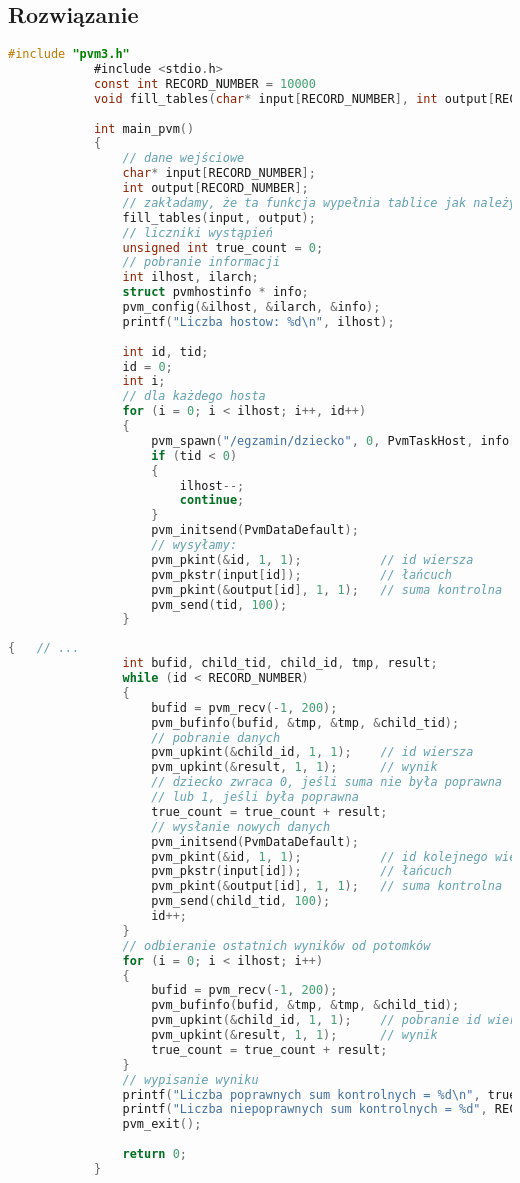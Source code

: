 		\subsection{Rozwiązanie}
			\begin{lstlisting}[language=C]
			#include "pvm3.h"
			#include <stdio.h>
			const int RECORD_NUMBER = 10000
			void fill_tables(char* input[RECORD_NUMBER], int output[RECORD_NUMBER]);
			
			int main_pvm()
			{
				// dane wejściowe
				char* input[RECORD_NUMBER];
				int output[RECORD_NUMBER];
				// zakładamy, że ta funkcja wypełnia tablice jak należy
				fill_tables(input, output);
				// liczniki wystąpień
				unsigned int true_count = 0;
				// pobranie informacji
				int ilhost, ilarch;
				struct pvmhostinfo * info;
				pvm_config(&ilhost, &ilarch, &info);
				printf("Liczba hostow: %d\n", ilhost);
				
				int id, tid;
				id = 0;
				int i;
				// dla każdego hosta
				for (i = 0; i < ilhost; i++, id++)
				{
					pvm_spawn("/egzamin/dziecko", 0, PvmTaskHost, info[i].hi_name, 1, &tid);
					if (tid < 0)
					{
						ilhost--;
						continue;
					}
					pvm_initsend(PvmDataDefault);
					// wysyłamy:
					pvm_pkint(&id, 1, 1);			// id wiersza
					pvm_pkstr(input[id]);			// łańcuch
					pvm_pkint(&output[id], 1, 1);	// suma kontrolna
					pvm_send(tid, 100);
				}
			\end{lstlisting}
			\newpage
			\begin{lstlisting}[language=C]
			{	// ...
				int bufid, child_tid, child_id, tmp, result;
				while (id < RECORD_NUMBER)
				{
					bufid = pvm_recv(-1, 200);
					pvm_bufinfo(bufid, &tmp, &tmp, &child_tid);
					// pobranie danych
					pvm_upkint(&child_id, 1, 1);	// id wiersza
					pvm_upkint(&result, 1, 1);		// wynik
					// dziecko zwraca 0, jeśli suma nie była poprawna
					// lub 1, jeśli była poprawna
					true_count = true_count + result;
					// wysłanie nowych danych
					pvm_initsend(PvmDataDefault);
					pvm_pkint(&id, 1, 1);			// id kolejnego wiersza
					pvm_pkstr(input[id]);			// łańcuch
					pvm_pkint(&output[id], 1, 1);	// suma kontrolna
					pvm_send(child_tid, 100);
					id++;
				}
				// odbieranie ostatnich wyników od potomków
				for (i = 0; i < ilhost; i++)
				{
					bufid = pvm_recv(-1, 200);
					pvm_bufinfo(bufid, &tmp, &tmp, &child_tid);
					pvm_upkint(&child_id, 1, 1);	// pobranie id wiersza
					pvm_upkint(&result, 1, 1);		// wynik
					true_count = true_count + result;
				}
				// wypisanie wyniku
				printf("Liczba poprawnych sum kontrolnych = %d\n", true_count);
				printf("Liczba niepoprawnych sum kontrolnych = %d", RECORD_NUMBER - true_count);
				pvm_exit();
				
				return 0;
			}
			\end{lstlisting}
		\newpage
